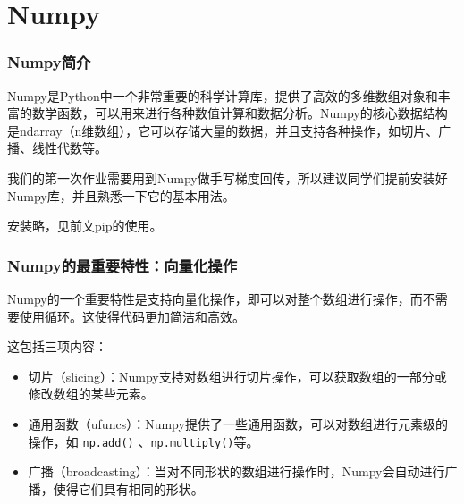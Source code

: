 % 
%
%

\section{Numpy}

\begin{frame}
    \frametitle{Numpy简介}

    Numpy是Python中一个非常重要的科学计算库，提供了高效的多维数组对象和丰富的数学函数，可以用来进行各种数值计算和数据分析。Numpy的核心数据结构是ndarray（n维数组），它可以存储大量的数据，并且支持各种操作，如切片、广播、线性代数等。

    我们的第一次作业需要用到Numpy做手写梯度回传，所以建议同学们提前安装好Numpy库，并且熟悉一下它的基本用法。

    安装略，见前文pip的使用。

\end{frame}

\begin{frame}[fragile]
    \frametitle{Numpy的最重要特性：向量化操作}

    Numpy的一个重要特性是支持向量化操作，即可以对整个数组进行操作，而不需要使用循环。这使得代码更加简洁和高效。

    这包括三项内容：
    \begin{itemize}
        \item 切片（slicing）：Numpy支持对数组进行切片操作，可以获取数组的一部分或修改数组的某些元素。
            \item 通用函数（ufuncs）：Numpy提供了一些通用函数，可以对数组进行元素级的操作，如 \texttt{np.add()} 、\texttt{np.multiply()}等。
        \item 广播（broadcasting）：当对不同形状的数组进行操作时，Numpy会自动进行广播，使得它们具有相同的形状。
    \end{itemize}

\end{frame}

